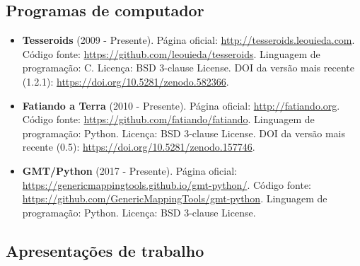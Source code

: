 \subsection{Programas de computador}

\begin{itemize}
    \item \textbf{Tesseroids} (2009 - Presente).
        Página oficial: \url{http://tesseroids.leouieda.com}.
        Código fonte: \url{https://github.com/leouieda/tesseroids}.
        Linguagem de programação: C.
        Licença: BSD 3-clause License.
        DOI da versão mais recente (1.2.1):
        \url{https://doi.org/10.5281/zenodo.582366}.
    \item \textbf{Fatiando a Terra} (2010 - Presente).
        Página oficial: \url{http://fatiando.org}.
        Código fonte: \url{https://github.com/fatiando/fatiando}.
        Linguagem de programação: Python.
        Licença: BSD 3-clause License.
        DOI da versão mais recente (0.5):
        \url{https://doi.org/10.5281/zenodo.157746}.
    \item \textbf{GMT/Python} (2017 - Presente).
        Página oficial: \url{https://genericmappingtools.github.io/gmt-python/}.
        Código fonte: \url{https://github.com/GenericMappingTools/gmt-python}.
        Linguagem de programação: Python.
        Licença: BSD 3-clause License.
\end{itemize}


\subsection{Apresentações de trabalho}


